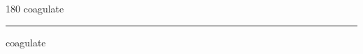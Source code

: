 
\begin{frame}
\begin{center}
\begin{turn}{180}
{\fontsize{2.5cm}{1em}\selectfont coagulate}
\end{turn}
\vspace{1em}\par  
\hrule
\vspace{1em}\par  
{\fontsize{2.5cm}{1em}\selectfont coagulate}
\end{center}
\end{frame}

